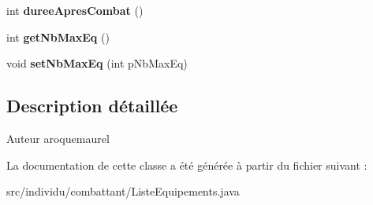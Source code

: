 \begin{DoxyCompactItemize}
\item 
\hypertarget{classindividu_1_1combattant_1_1_liste_equipements_ae92d592c6d61c7a767f66e51118b9afa}{int {\bfseries duree\-Apres\-Combat} ()}\label{classindividu_1_1combattant_1_1_liste_equipements_ae92d592c6d61c7a767f66e51118b9afa}

\item 
\hypertarget{classindividu_1_1combattant_1_1_liste_equipements_abe918cd79ec7bc71655efbcdf320d86a}{int {\bfseries get\-Nb\-Max\-Eq} ()}\label{classindividu_1_1combattant_1_1_liste_equipements_abe918cd79ec7bc71655efbcdf320d86a}

\item 
\hypertarget{classindividu_1_1combattant_1_1_liste_equipements_a4ad481963d8b9c35a0994522c506bd48}{void {\bfseries set\-Nb\-Max\-Eq} (int p\-Nb\-Max\-Eq)}\label{classindividu_1_1combattant_1_1_liste_equipements_a4ad481963d8b9c35a0994522c506bd48}

\end{DoxyCompactItemize}


\subsection{Description détaillée}
\begin{DoxyAuthor}{Auteur}
aroquemaurel 
\end{DoxyAuthor}


La documentation de cette classe a été générée à partir du fichier suivant \-:\begin{DoxyCompactItemize}
\item 
src/individu/combattant/Liste\-Equipements.\-java\end{DoxyCompactItemize}
